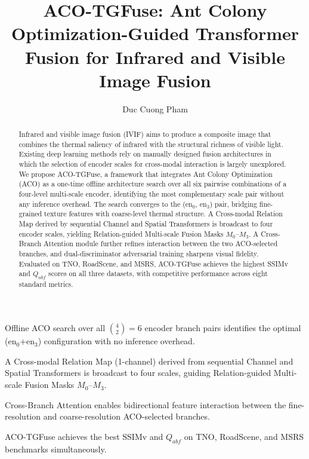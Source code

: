 \documentclass[a4paper,fleqn]{cas-dc}
\begin{document}
\let\WriteBookmarks\relax
\def\floatpagepagefraction{1}
\def\textpagefraction{.001}


\title[mode=title]{ACO-TGFuse: Ant Colony Optimization-Guided Transformer Fusion for Infrared and Visible Image Fusion}

\author[1]{Duc Cuong Pham}

\address[1]{Faculty of Information Technology, [Institution], Vietnam}

\begin{abstract}
Infrared and visible image fusion (IVIF) aims to produce a composite image
that combines the thermal saliency of infrared with the structural richness
of visible light.  Existing deep learning methods rely on manually designed
fusion architectures in which the selection of encoder scales for cross-modal
interaction is largely unexplored.  We propose ACO-TGFuse, a framework that
integrates Ant Colony Optimization (ACO) as a one-time offline architecture
search over all six pairwise combinations of a four-level multi-scale encoder,
identifying the most complementary scale pair without any inference overhead.
The search converges to the ($\mathrm{en}_0$, $\mathrm{en}_3$) pair, bridging
fine-grained texture features with coarse-level thermal structure.  A
Cross-modal Relation Map derived by sequential Channel and Spatial Transformers
is broadcast to four encoder scales, yielding Relation-guided Multi-scale
Fusion Masks $M_0$--$M_3$.  A Cross-Branch Attention module further refines
interaction between the two ACO-selected branches, and dual-discriminator
adversarial training sharpens visual fidelity.  Evaluated on TNO, RoadScene,
and MSRS, ACO-TGFuse achieves the highest SSIMv and $Q_{abf}$ scores on all
three datasets, with competitive performance across eight standard metrics.
\end{abstract}

\begin{highlights}
\item Offline ACO search over all $\binom{4}{2}=6$ encoder branch pairs
      identifies the optimal ($\mathrm{en}_0$+$\mathrm{en}_3$) configuration
      with no inference overhead.

\item A Cross-modal Relation Map (1-channel) derived from sequential Channel
      and Spatial Transformers is broadcast to four scales, guiding
      Relation-guided Multi-scale Fusion Masks $M_0$--$M_3$.

\item Cross-Branch Attention enables bidirectional feature interaction between
      the fine-resolution and coarse-resolution ACO-selected branches.

\item ACO-TGFuse achieves the best SSIMv and $Q_{abf}$ on TNO, RoadScene, and
      MSRS benchmarks simultaneously.
\end{highlights}
\end{document}
